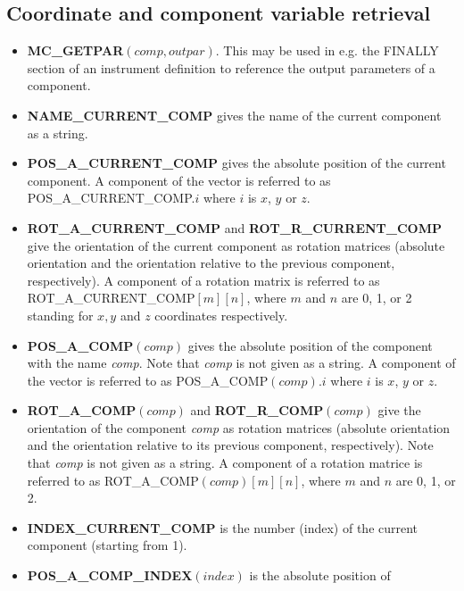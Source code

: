 \subsection{Coordinate and component variable retrieval}
\begin{itemize}
\item {\bf MC\_GETPAR}$(comp, outpar)$. This may be used in e.g. the FINALLY section of an
  instrument definition to reference the output parameters of a
  component.
\item {\bf NAME\_CURRENT\_COMP} gives the name of the current component as a string.
\item {\bf POS\_A\_CURRENT\_COMP} gives the absolute position of the
  current component. A component of the vector is referred to as
  POS\_A\_CURRENT\_COMP.$i$ where $i$ is $x$, $y$ or $z$.
\item {\bf ROT\_A\_CURRENT\_COMP} and
  {\bf ROT\_R\_CURRENT\_COMP} give the orientation
  of the current component as rotation matrices
  (absolute orientation and the orientation relative to
  the previous component, respectively). A
  component of a rotation matrix is referred to as
  ROT\_A\_CURRENT\_COMP$[m][n]$, where $m$ and
  $n$ are 0, 1, or 2 standing for $x,y$ and $z$ coordinates respectively.
\item {\bf POS\_A\_COMP}$(comp)$ gives the absolute position
  of the component with the name {\em comp}. Note that
  {\em comp} is not given as a string. A component of the
  vector is referred to as POS\_A\_COMP$(comp).i$
  where $i$ is $x$, $y$ or $z$.
\item {\bf ROT\_A\_COMP}$(comp)$ and
  {\bf ROT\_R\_COMP}$(comp)$ give the orientation of the
  component {\em comp} as rotation matrices (absolute
  orientation and the orientation relative to its
  previous component, respectively). Note that {\em comp}
  is not given as a string. A component of  a rotation
  matrice is referred to as
  ROT\_A\_COMP$(comp)[m][n]$, where $m$ and $n$ are
  0, 1, or 2.
\item {\bf INDEX\_CURRENT\_COMP} is the number (index) of the
       current component  (starting from 1).
\item {\bf POS\_A\_COMP\_INDEX}$(index)$ is the absolute position of

\end{itemize}
